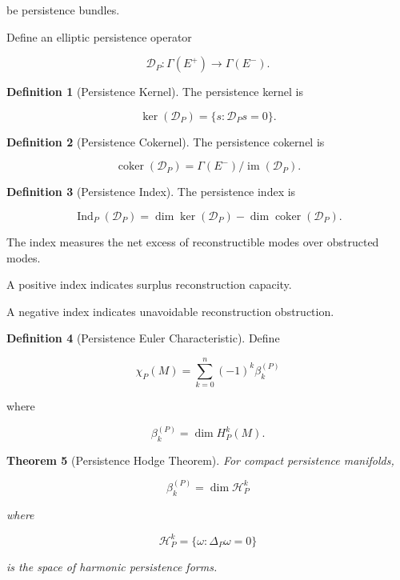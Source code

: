 \documentclass[12pt,oneside]{article}
\newtheorem{theorem}{Theorem}[section] \newtheorem{lemma}[theorem]{Lemma} \newtheorem{proposition}[theorem]{Proposition} \newtheorem{corollary}[theorem]{Corollary}
\theoremstyle{definition}
\newtheorem{definition}[theorem]{Definition} \newtheorem{axiom}[theorem]{Axiom} \newtheorem{remark}[theorem]{Remark} \newtheorem{example}[theorem]{Example}
\begin{document}
be persistence bundles.

Define an elliptic persistence operator

\[
\mathcal D_P :
\Gamma(E^+)
\rightarrow
\Gamma(E^-).
\]

\begin{definition}[Persistence Kernel]

The persistence kernel is

\[
\ker(\mathcal D_P)
=
\{
s:
\mathcal D_P s=0
\}.
\]

\end{definition}

\begin{definition}[Persistence Cokernel]

The persistence cokernel is

\[
\operatorname{coker}(\mathcal D_P)
=
\Gamma(E^-)
/\operatorname{im}(\mathcal D_P).
\]

\end{definition}

\begin{definition}[Persistence Index]

The persistence index is

\[
\operatorname{Ind}_P(\mathcal D_P)
=
\dim
\ker(\mathcal D_P)
-
\dim
\operatorname{coker}(\mathcal D_P).
\]

\end{definition}

The index measures the net excess of reconstructible modes over obstructed modes.

A positive index indicates surplus reconstruction capacity.

A negative index indicates unavoidable reconstruction obstruction.

\begin{definition}[Persistence Euler Characteristic]

Define

\[
\chi_P(M)
=
\sum_{k=0}^{n}
(-1)^k
\beta_k^{(P)}
\]

where

\[
\beta_k^{(P)}
=
\dim H_P^k(M).
\]

\end{definition}

\begin{theorem}[Persistence Hodge Theorem]

For compact persistence manifolds,

\[
\beta_k^{(P)}
=
\dim
\mathcal H_P^k
\]

where

\[
\mathcal H_P^k
=
\{
\omega:
\Delta_P\omega=0
\}
\]

is the space of harmonic persistence forms.

\end{theorem}
\end{document}
